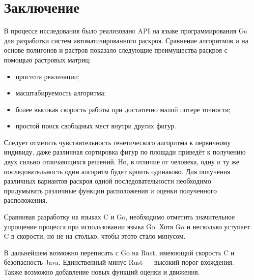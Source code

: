 \documentclass[14pt]{extarticle}
\begin{document}
	\section{Заключение}
	В процессе исследования было реализовано API на языке программирования Go для разработки систем автоматизированного раскроя. Сравнение алгоритмов и на основе полигонов и растров показало следующие преимущества раскроя с помощью растровых матриц:
	\begin{itemize}
		\item простота реализации;
		\item масштабируемость алгоритма;
		\item более высокая скорость работы при достаточно малой потере точности;
		\item простой поиск свободных мест внутри других фигур.		
	\end{itemize}

	Следует отметить чувствительность генетического алгоритма к первичному индивиду, даже различная сортировка фигур по площади приведёт к получению двух сильно отличающихся решений. Но, в отличие от человека, одну и ту же последовательность один алгоритм будет кроить одинаково. Для получения различных вариантов раскроя одной последовательности необходимо придумывать различные функции расположения и оценки полученного расположения.
	
	Сравнивая разработку на языках C и Go, необходимо отметить значительное упрощение процесса при использовании языка Go. Хотя Go и несколько уступает C в скорости, но не на столько, чтобы этото стало минусом.
	
	В дальнейшем возможно переписать с Go на Rust, имеюющий скорость C и безопасность Java. Единственный минус Rust --- высокий порог вхождения. Также возможно добавление новых функций оценки и движения.
\end{document}
